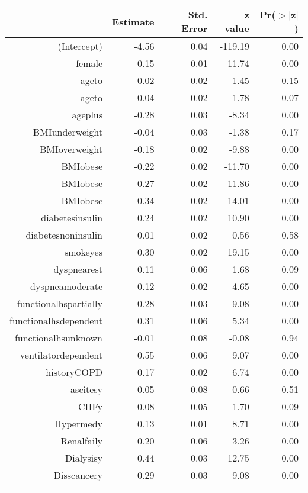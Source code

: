 \bigskip\bigskip
\centering
\begin{tabular}{rrrrr}
  \hline
 & Estimate & Std. Error & z value & Pr($>$$|$z$|$) \\ 
  \hline
(Intercept) & -4.56 & 0.04 & -119.19 & 0.00 \\ 
  female & -0.15 & 0.01 & -11.74 & 0.00 \\ 
  age\-65\-to\-74 & -0.02 & 0.02 & -1.45 & 0.15 \\ 
  age\-75\-to\-84 & -0.04 & 0.02 & -1.78 & 0.07 \\ 
  age\-85\-plus & -0.28 & 0.03 & -8.34 & 0.00 \\ 
  BMI\-underweight & -0.04 & 0.03 & -1.38 & 0.17 \\ 
  BMI\-overweight & -0.18 & 0.02 & -9.88 & 0.00 \\ 
  BMI\-obese\-1 & -0.22 & 0.02 & -11.70 & 0.00 \\ 
  BMI\-obese\-2 & -0.27 & 0.02 & -11.86 & 0.00 \\ 
  BMI\-obese\-3 & -0.34 & 0.02 & -14.01 & 0.00 \\ 
  diabetes\-insulin & 0.24 & 0.02 & 10.90 & 0.00 \\ 
  diabetes\-noninsulin & 0.01 & 0.02 & 0.56 & 0.58 \\ 
  smoke\-yes & 0.30 & 0.02 & 19.15 & 0.00 \\ 
  dyspnea\-rest & 0.11 & 0.06 & 1.68 & 0.09 \\ 
  dyspnea\-moderate & 0.12 & 0.02 & 4.65 & 0.00 \\ 
  functional\-hs\-partially & 0.28 & 0.03 & 9.08 & 0.00 \\ 
  functional\-hs\-dependent & 0.31 & 0.06 & 5.34 & 0.00 \\ 
  functional\-hs\-unknown & -0.01 & 0.08 & -0.08 & 0.94 \\ 
  ventilator\-dependent & 0.55 & 0.06 & 9.07 & 0.00 \\ 
  history\-COPD & 0.17 & 0.02 & 6.74 & 0.00 \\ 
  ascites\-y & 0.05 & 0.08 & 0.66 & 0.51 \\ 
  CHF\-y & 0.08 & 0.05 & 1.70 & 0.09 \\ 
  Hyper\-med\-y & 0.13 & 0.01 & 8.71 & 0.00 \\ 
  Renal\-fail\-y & 0.20 & 0.06 & 3.26 & 0.00 \\ 
  Dialysis\-y & 0.44 & 0.03 & 12.75 & 0.00 \\ 
  Diss\-cancer\-y & 0.29 & 0.03 & 9.08 & 0.00 \\ 
$$
\end{tabular}
